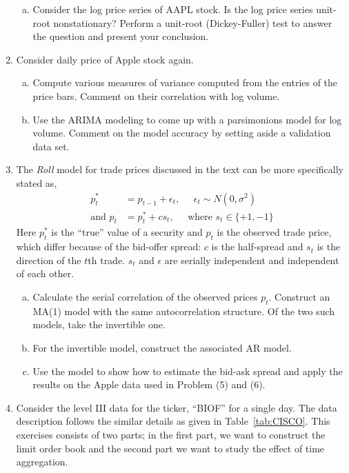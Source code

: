 \begin{enumerate}[1.]
\begin{enumerate}[(a)]
\item Consider the log price series of AAPL stock. Is the log price series unit-root nonstationary? Perform a unit-root (Dickey-Fuller) test to answer the question and present your conclusion.
\end{enumerate}

\item Consider daily price of Apple stock again.
\begin{enumerate}[(a)]
\item Compute various measures of variance computed from the entries of the price bars. Comment on their correlation with log volume. 

\item Use the ARIMA modeling to come up with a parsimonions model for log volume. Comment on the model accuracy by setting aside a validation data set. 
\end{enumerate}


\item The \textit{Roll} model for trade prices discussed in the text can be more specifically stated as,
	\[
	\begin{split}
	p_t^*&= p_{t-1} + \epsilon_t, \;\;\;\;\; \epsilon_t \sim N(0,\sigma^2) \\
	\text{and } p_t&= p_t^* + c s_t, \;\;\;\;\; \text{where }s_t \in \{+1,-1\}
	\end{split}
	\]
Here $p_t^*$ is the ``true'' value of a security and $p_t$ is the observed trade price, which differ because of the bid-offer spread: $c$ is the half-spread and $s_t$ is the direction of the $t$th trade. $s_t$ and $\epsilon$ are serially independent and independent of each other.
\begin{enumerate}[(a)]
\item Calculate the serial correlation of the observed prices $p_t$. Construct an MA(1) model with the same autocorrelation structure. Of the two such models, take the invertible one. 

\item For the invertible model, construct the associated AR model. 

\item Use the model to show how to estimate the bid-ask spread and apply the results on the Apple data used in Problem (5) and (6). \\
\end{enumerate}



\item Consider the level III data for the ticker, ``BIOF'' for a single day. The data description follows the similar details as given in Table~\ref{tab:CISCO}. This exercises consists of two parts; in the first part, we want to construct the limit order book and the second part we want to study the effect of time aggregation. 


\end{enumerate}
